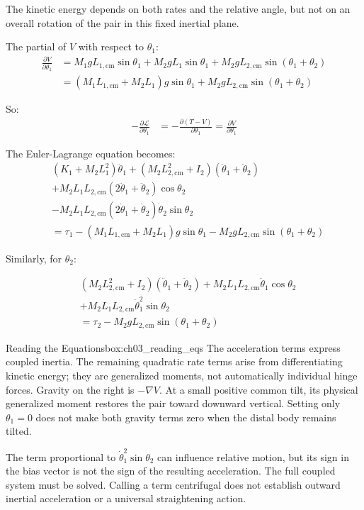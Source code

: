 The kinetic energy depends on both rates and the relative angle, but not on an overall rotation of the pair in this fixed inertial plane.

The partial of $V$ with respect to $\theta_1$:
\begin{align}
\frac{\partial V}{\partial \theta_1} &= M_1 g L_{1,\text{cm}} \sin \theta_1 + M_2 g L_1 \sin \theta_1 + M_2 g L_{2,\text{cm}} \sin(\theta_1 + \theta_2) \\
&= (M_1 L_{1,\text{cm}} + M_2 L_1) g \sin \theta_1 + M_2 g L_{2,\text{cm}} \sin(\theta_1 + \theta_2)
\end{align}

So:
\begin{align}
-\frac{\partial \mathcal{L}}{\partial \theta_1} &= -\frac{\partial (T - V)}{\partial \theta_1} = \frac{\partial V}{\partial \theta_1}
\end{align}

The Euler-Lagrange equation becomes:
\begin{align}
&(K_1 + M_2 L_1^2) \ddot{\theta}_1 + (M_2 L_{2,\text{cm}}^2 + I_2) (\ddot{\theta}_1 + \ddot{\theta}_2) \\
&+ M_2 L_1 L_{2,\text{cm}} (2 \ddot{\theta}_1 + \ddot{\theta}_2) \cos \theta_2 \\
&- M_2 L_1 L_{2,\text{cm}} (2 \dot{\theta}_1 + \dot{\theta}_2) \dot{\theta}_2 \sin \theta_2 \\
&= \tau_1-(M_1 L_{1,\text{cm}} + M_2 L_1) g \sin \theta_1 - M_2 g L_{2,\text{cm}} \sin(\theta_1 + \theta_2)
\label{eq:ch03_eq1_raw}
\end{align}

Similarly, for $\theta_2$:

\begin{align}
&(M_2 L_{2,\text{cm}}^2 + I_2) (\ddot{\theta}_1 + \ddot{\theta}_2) + M_2 L_1 L_{2,\text{cm}} \ddot{\theta}_1 \cos \theta_2 \\
&+ M_2 L_1 L_{2,\text{cm}} \dot{\theta}_1^2 \sin \theta_2 \\
&= \tau_2-M_2 g L_{2,\text{cm}} \sin(\theta_1 + \theta_2)
\label{eq:ch03_eq2_raw}
\end{align}


\begin{laymansbox}{Reading the Equations}{box:ch03_reading_eqs}
The acceleration terms express coupled inertia. The remaining quadratic rate terms arise from differentiating kinetic energy; they are generalized moments, not automatically individual hinge forces. Gravity on the right is $-\nabla V$. At a small positive common tilt, its physical generalized moment restores the pair toward downward vertical. Setting only $\theta_1=0$ does not make both gravity terms zero when the distal body remains tilted.

The term proportional to $\dot\theta_1^2\sin\theta_2$ can influence relative motion, but its sign in the bias vector is not the sign of the resulting acceleration. The full coupled system must be solved. Calling a term centrifugal does not establish outward inertial acceleration or a universal straightening action.
\end{laymansbox}

